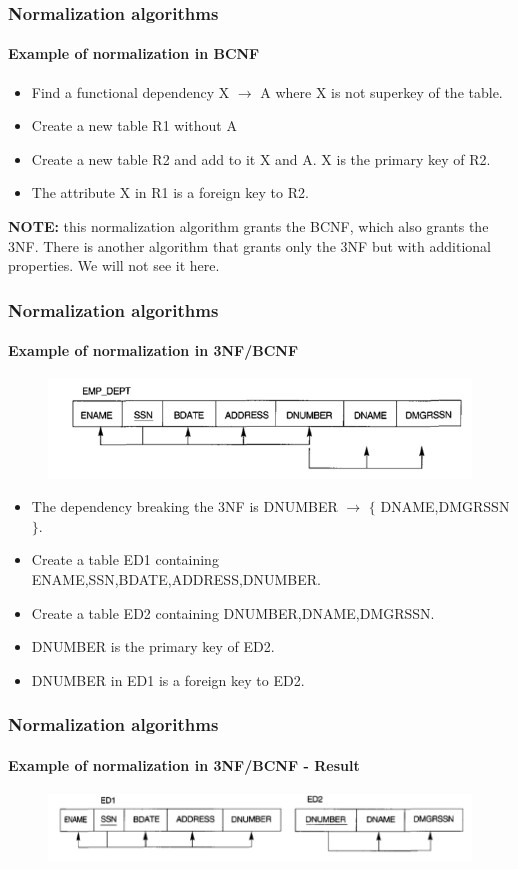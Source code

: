 \documentclass{beamer}
\newcommand{\valseq}[1]{$\lbrace$ #1 $\rbrace$}
\newcommand{\fdep}[2]{#1 $\rightarrow$ #2}
\begin{document}
\begin{frame}
	\frametitle{Normalization algorithms}
	\framesubtitle{Example of normalization in BCNF}
	
	\begin{itemize}
		\item Find a functional dependency \fdep{X}{A} where X is not superkey of the table.
\pause
		\item Create a new table R1 without A
\pause
		\item Create a new table R2 and add to it X and A. X is the primary key of R2.
\pause
		\item The attribute X in R1 is a foreign key to R2.
	\end{itemize}
	
	\textbf{NOTE:} this normalization algorithm grants the BCNF, which also grants the 3NF. There is another algorithm that grants only the 3NF but with additional properties. We will not see it here.
\end{frame}

\begin{frame}
	\frametitle{Normalization algorithms}
	\framesubtitle{Example of normalization in 3NF/BCNF}
	
	\begin{figure}
		\includegraphics[scale=0.5]{img/normalization/norm17}
	\end{figure}
	
	\begin{itemize}
		\item The dependency breaking the 3NF is \fdep{DNUMBER}{\valseq{DNAME,DMGRSSN}}.
		\item Create a table ED1 containing ENAME,SSN,BDATE,ADDRESS,DNUMBER.
		\item Create a table ED2 containing DNUMBER,DNAME,DMGRSSN.
		\item DNUMBER is the primary key of ED2.
		\item DNUMBER in ED1 is a foreign key to ED2. 
		
	\end{itemize}
\end{frame}

\begin{frame}
	\frametitle{Normalization algorithms}
	\framesubtitle{Example of normalization in 3NF/BCNF - Result}
	
	\begin{figure}
		\includegraphics[scale=0.4]{img/normalization/norm18}
	\end{figure}
\end{frame}
\end{document}
